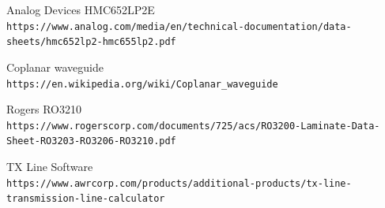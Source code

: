 \documentclass[10pt, a4paper, twocolumn]{article}
\begin{document}
\begin{thebibliography}{9}

Analog Devices HMC652LP2E
\\\texttt{https://www.analog.com/media/en/technical-documentation/data-sheets/hmc652lp2-hmc655lp2.pdf}

Coplanar waveguide
\\\texttt{https://en.wikipedia.org/wiki/Coplanar\_waveguide}

Rogers RO3210
\\\texttt{https://www.rogerscorp.com/documents/725/acs/RO3200-Laminate-Data-Sheet-RO3203-RO3206-RO3210.pdf}

TX Line Software
\\\texttt{https://www.awrcorp.com/products/additional-products/tx-line-transmission-line-calculator}

\end{thebibliography}
\end{document}
